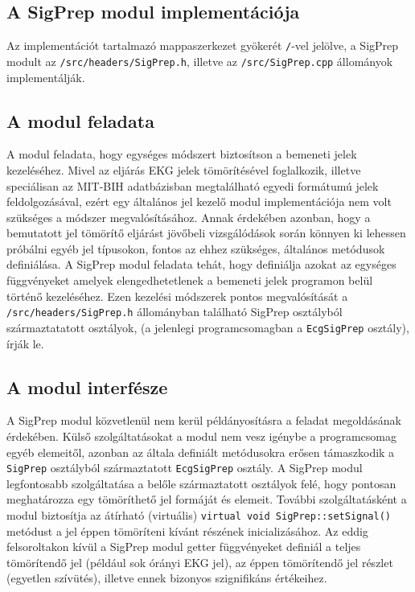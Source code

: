\documentclass[oneside,titlepage,12pt,a4paper]{report}
\begin{document}
\subsection{A SigPrep modul implementációja}

Az implementációt tartalmazó mappaszerkezet gyökerét \texttt{/}-vel jelölve, a SigPrep modult  az \texttt{/src/headers/SigPrep.h}, illetve az \texttt{/src/SigPrep.cpp} állományok implementálják. 

\subsection*{A modul feladata}

\par A modul feladata, hogy egységes módszert biztosítson a bemeneti jelek kezeléséhez. 
Mivel az eljárás EKG jelek tömörítésével foglalkozik, illetve speciálisan az MIT-BIH adatbázisban megtalálható egyedi formátumú jelek feldolgozásával, 
ezért egy általános jel kezelő modul implementációja nem volt szükséges a módszer megvalósításához. Annak érdekében azonban, 
hogy a bemutatott jel tömörítő eljárást jövőbeli vizsgálódások során könnyen ki lehessen próbálni egyéb jel típusokon, fontos az ehhez szükséges, általános metódusok definiálása. A SigPrep modul feladata tehát, hogy definiálja azokat az egységes függvényeket amelyek elengedhetetlenek a bemeneti jelek programon belül történő kezeléséhez. Ezen kezelési módszerek pontos megvalósítását a \texttt{/src/headers/SigPrep.h} állományban található SigPrep osztályból származtatatott osztályok, (a jelenlegi programcsomagban a \texttt{EcgSigPrep} osztály), írják le. 

\subsection*{A modul interfésze}

\par A SigPrep modul közvetlenül nem kerül példányosításra a feladat megoldásának érdekében. Külső szolgáltatásokat a modul nem vesz igénybe a programcsomag egyéb elemeitől, azonban az általa definiált metódusokra erősen támaszkodik a \texttt{SigPrep} osztályból származtatott \texttt{EcgSigPrep} osztály. A SigPrep modul legfontosabb szolgáltatása a belőle származtatott osztályok felé, hogy pontosan meghatározza egy tömöríthető jel formáját és elemeit. További szolgáltatásként a modul biztosítja az átírható (virtuális) \texttt{virtual void SigPrep::setSignal()} metódust a jel éppen tömöríteni kívánt részének inicializásához. Az eddig felsoroltakon kívül a SigPrep modul getter függvényeket definiál a teljes tömörítendő jel (például sok órányi EKG jel), az éppen tömörítendő jel részlet (egyetlen szívütés), illetve ennek bizonyos szignifikáns értékeihez. 
\end{document}
